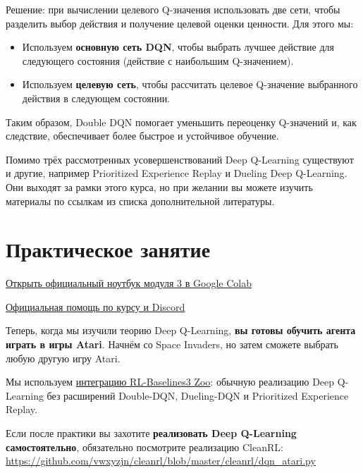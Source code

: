 \documentclass[11pt,a4paper]{article}
\begin{document}
Решение: при вычислении целевого Q-значения использовать две сети, чтобы разделить выбор действия и получение целевой оценки ценности. Для этого мы:

\begin{itemize}
\tightlist
\item
Используем \textbf{основную сеть DQN}, чтобы выбрать лучшее действие для следующего состояния (действие с наибольшим Q-значением).
\item
Используем \textbf{целевую сеть}, чтобы рассчитать целевое Q-значение выбранного действия в следующем состоянии.
\end{itemize}

Таким образом, Double DQN помогает уменьшить переоценку Q-значений и, как следствие, обеспечивает более быстрое и устойчивое обучение.

Помимо трёх рассмотренных усовершенствований Deep Q-Learning существуют и другие, например Prioritized Experience Replay и Dueling Deep Q-Learning. Они выходят за рамки этого курса, но при желании вы можете изучить материалы по ссылкам из списка дополнительной литературы.

\section{Практическое занятие}\label{hands-on}

\href{https://colab.research.google.com/github/huggingface/deep-rl-class/blob/main/notebooks/unit3/unit3.ipynb}{Открыть официальный ноутбук модуля 3 в Google Colab}

\href{http://hf.co/join/discord}{Официальная помощь по курсу и Discord}

Теперь, когда мы изучили теорию Deep Q-Learning, \textbf{вы готовы обучить агента играть в игры Atari}. Начнём со Space Invaders, но затем сможете выбрать любую другую игру Atari.


Мы используем \href{https://github.com/DLR-RM/rl-baselines3-zoo}{интеграцию RL-Baselines3 Zoo}: обычную реализацию Deep Q-Learning без расширений Double-DQN, Dueling-DQN и Prioritized Experience Replay.

Если после практики вы захотите \textbf{реализовать Deep Q-Learning самостоятельно}, обязательно посмотрите реализацию CleanRL: \url{https://github.com/vwxyzjn/cleanrl/blob/master/cleanrl/dqn_atari.py}
\end{document}
